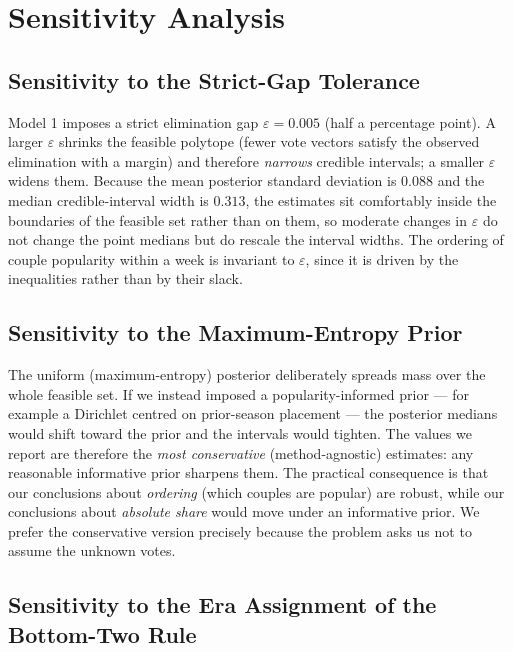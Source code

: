 \documentclass{article}
\begin{document}
\section{Sensitivity Analysis}\label{sec:sensitivity}

\subsection{Sensitivity to the Strict-Gap Tolerance}

Model 1 imposes a strict elimination gap $\varepsilon=0.005$ (half a percentage point). A
larger $\varepsilon$ shrinks the feasible polytope (fewer vote vectors satisfy the observed
elimination with a margin) and therefore \emph{narrows} credible intervals; a smaller
$\varepsilon$ widens them. Because the mean posterior standard deviation is $0.088$ and the
median credible-interval width is $0.313$, the estimates sit comfortably inside the
boundaries of the feasible set rather than on them, so moderate changes in $\varepsilon$ do
not change the point medians but do rescale the interval widths. The ordering of couple
popularity within a week is invariant to $\varepsilon$, since it is driven by the inequalities
rather than by their slack.

\subsection{Sensitivity to the Maximum-Entropy Prior}

The uniform (maximum-entropy) posterior deliberately spreads mass over the whole feasible
set. If we instead imposed a popularity-informed prior --- for example a Dirichlet centred
on prior-season placement --- the posterior medians would shift toward the prior and the
intervals would tighten. The values we report are therefore the \emph{most conservative}
(method-agnostic) estimates: any reasonable informative prior sharpens them. The practical
consequence is that our conclusions about \emph{ordering} (which couples are popular) are
robust, while our conclusions about \emph{absolute share} would move under an informative
prior. We prefer the conservative version precisely because the problem asks us not to assume
the unknown votes.

\subsection{Sensitivity to the Era Assignment of the Bottom-Two Rule}
\end{document}
